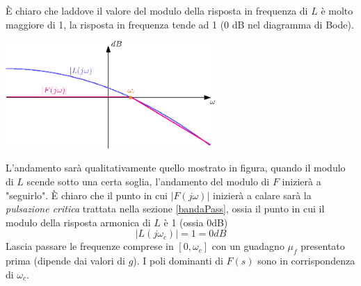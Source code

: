 \documentclass[10pt, letterpaper]{report}
\begin{document}
È chiaro che laddove il valore del modulo della risposta in frequenza di $L$ è molto maggiore di 1, la risposta in frequenza tende ad 1 (0 dB nel diagramma di Bode). \begin{center}
    \includegraphics[width=0.6\textwidth ]{images/situazioneTipicaF.eps}
\end{center}L'andamento sarà qualitativamente quello mostrato in figura, quando il modulo di $L$ scende sotto una certa soglia, l'andamento del modulo di $F$ inizierà a "seguirlo".
È chiaro che il punto in cui $|F(j\omega)|$ inizierà a calare sarà la \textit{pulsazione critica} trattata nella sezione \ref{bandaPass}, ossia il punto in cui il modulo della risposta armonica di $L$ è 1 (ossia 0dB)
$$|L(j\omega_c)|=1=0dB$$
Lascia passare le frequenze comprese in $[0,\omega_c]$ con un guadagno $\mu_f$ presentato prima (dipende dai valori di $g$). I poli dominanti di $F(s)$ sono in corrispondenza di $\omega_c$.
\end{document}
